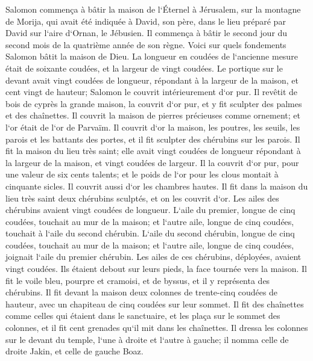 \verse Salomon commença à bâtir la maison de l`Éternel à Jérusalem, sur la montagne de Morija, qui avait été indiquée à David, son père, dans le lieu préparé par David sur l`aire d`Ornan, le Jébusien. 
\verse Il commença à bâtir le second jour du second mois de la quatrième année de son règne. 
\verse Voici sur quels fondements Salomon bâtit la maison de Dieu. La longueur en coudées de l`ancienne mesure était de soixante coudées, et la largeur de vingt coudées. 
\verse Le portique sur le devant avait vingt coudées de longueur, répondant à la largeur de la maison, et cent vingt de hauteur; Salomon le couvrit intérieurement d`or pur. 
\verse Il revêtit de bois de cyprès la grande maison, la couvrit d`or pur, et y fit sculpter des palmes et des chaînettes. 
\verse Il couvrit la maison de pierres précieuses comme ornement; et l`or était de l`or de Parvaïm. 
\verse Il couvrit d`or la maison, les poutres, les seuils, les parois et les battants des portes, et il fit sculpter des chérubins sur les parois. 
\verse Il fit la maison du lieu très saint; elle avait vingt coudées de longueur répondant à la largeur de la maison, et vingt coudées de largeur. Il la couvrit d`or pur, pour une valeur de six cents talents; 
\verse et le poids de l`or pour les clous montait à cinquante sicles. Il couvrit aussi d`or les chambres hautes. 
\verse Il fit dans la maison du lieu très saint deux chérubins sculptés, et on les couvrit d`or. 
\verse Les ailes des chérubins avaient vingt coudées de longueur. L`aile du premier, longue de cinq coudées, touchait au mur de la maison; et l`autre aile, longue de cinq coudées, touchait à l`aile du second chérubin. 
\verse L`aile du second chérubin, longue de cinq coudées, touchait au mur de la maison; et l`autre aile, longue de cinq coudées, joignait l`aile du premier chérubin. 
\verse Les ailes de ces chérubins, déployées, avaient vingt coudées. Ils étaient debout sur leurs pieds, la face tournée vers la maison. 
\verse Il fit le voile bleu, pourpre et cramoisi, et de byssus, et il y représenta des chérubins. 
\verse Il fit devant la maison deux colonnes de trente-cinq coudées de hauteur, avec un chapiteau de cinq coudées sur leur sommet. 
\verse Il fit des chaînettes comme celles qui étaient dans le sanctuaire, et les plaça sur le sommet des colonnes, et il fit cent grenades qu`il mit dans les chaînettes. 
\verse Il dressa les colonnes sur le devant du temple, l`une à droite et l`autre à gauche; il nomma celle de droite Jakin, et celle de gauche Boaz. 

\chapter{}

